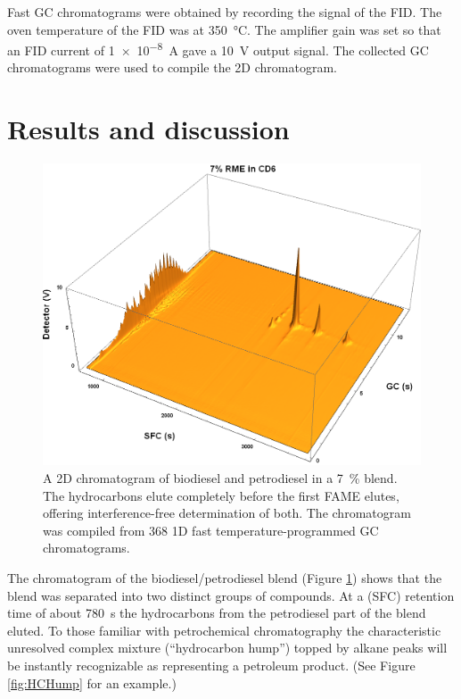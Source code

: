 Fast GC chromatograms were obtained by recording the signal of the FID. The oven
temperature of the FID was at \SI{350}{\celsius}. The amplifier gain was set so
that an FID current of \SI{1e-8}{\ampere} gave a \SI{10}{\volt} output signal.
The collected GC chromatograms were used to compile the 2D chromatogram.

\section{Results and discussion}


\begin{figure}
	\centering
	\includegraphics[width=\textwidth]{Figures/PAH_FAMEs.png}
	\decoRule	
	
\caption[Biodiesel separated from petrodiesel.]{A 2D chromatogram of biodiesel
and petrodiesel in a \SI{7}{\percent} blend. The hydrocarbons elute completely
before the first FAME elutes, offering interference-free determination of both.
The chromatogram was compiled from \num{368} 1D fast temperature-programmed GC
chromatograms.}

	\label{fig:PAH_FAMEs} 
\end{figure}




The chromatogram of the biodiesel/petrodiesel blend (Figure \ref{fig:PAH_FAMEs})
shows that the blend was separated into two distinct groups of compounds. At a
\oneD (SFC) retention time of about \SI{780}{\second} the hydrocarbons from the
petrodiesel part of the blend eluted. To those familiar with petrochemical
chromatography the characteristic unresolved complex mixture (``hydrocarbon
hump'') topped by alkane peaks will be instantly recognizable as representing a
petroleum product. (See Figure \ref{fig:HCHump} for an example.)

